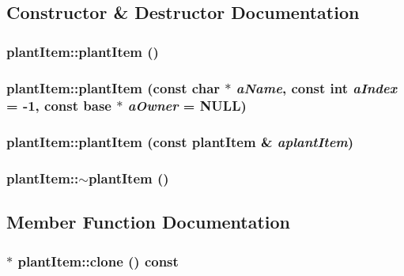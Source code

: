 \subsection{Constructor \& Destructor Documentation}
\hypertarget{classplant_item_ac93fe7d6cc8d879ed9d646769023c09e}{
\subsubsection[{plantItem}]{\setlength{\rightskip}{0pt plus 5cm}plantItem::plantItem ()}}
\label{classplant_item_ac93fe7d6cc8d879ed9d646769023c09e}
\hypertarget{classplant_item_a968d1e08695684a7e8a030a358ac6207}{
\subsubsection[{plantItem}]{\setlength{\rightskip}{0pt plus 5cm}plantItem::plantItem (const char $\ast$ {\em aName}, \/  const int {\em aIndex} = {\ttfamily -\/1}, \/  const {\bf base} $\ast$ {\em aOwner} = {\ttfamily NULL})}}
\label{classplant_item_a968d1e08695684a7e8a030a358ac6207}
\hypertarget{classplant_item_af4f30aea1be38af35207388520405d9b}{
\subsubsection[{plantItem}]{\setlength{\rightskip}{0pt plus 5cm}plantItem::plantItem (const {\bf plantItem} \& {\em aplantItem})}}
\label{classplant_item_af4f30aea1be38af35207388520405d9b}
\hypertarget{classplant_item_a4e87de98904bd879da41009e546009fa}{
\subsubsection[{$\sim$plantItem}]{\setlength{\rightskip}{0pt plus 5cm}plantItem::$\sim$plantItem ()}}
\label{classplant_item_a4e87de98904bd879da41009e546009fa}


\subsection{Member Function Documentation}
\hypertarget{classplant_item_ae9aec44d433339eca078b4277801717a}{
\subsubsection[{clone}]{ $\ast$ plantItem::clone () const}}
\label{classplant_item_ae9aec44d433339eca078b4277801717a}


